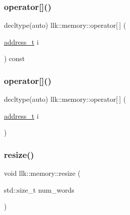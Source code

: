 \subsubsection{\texorpdfstring{operator[]()}{operator[]()}\hspace{0.1cm}{\footnotesize\ttfamily [1/2]}}
{\footnotesize\ttfamily decltype(auto) llk\+::memory\+::operator\mbox{[}$\,$\mbox{]} (\begin{DoxyParamCaption}\item[{\hyperlink{classllk_1_1memory_ae7a4b897aa999f22e250dc8e4d773dec}{address\+\_\+t}}]{i }\end{DoxyParamCaption}) const\hspace{0.3cm}{\ttfamily [inline]}}

\mbox{\label{classllk_1_1memory_aefa4c0ffc2836b50f88d3f67c68eb9b6}} 
\subsubsection{\texorpdfstring{operator[]()}{operator[]()}\hspace{0.1cm}{\footnotesize\ttfamily [2/2]}}
{\footnotesize\ttfamily decltype(auto) llk\+::memory\+::operator\mbox{[}$\,$\mbox{]} (\begin{DoxyParamCaption}\item[{\hyperlink{classllk_1_1memory_ae7a4b897aa999f22e250dc8e4d773dec}{address\+\_\+t}}]{i }\end{DoxyParamCaption})\hspace{0.3cm}{\ttfamily [inline]}}

\mbox{\label{classllk_1_1memory_aaaa33a11f4fcd7d45f4689ef8e5ccb04}} 
\subsubsection{\texorpdfstring{resize()}{resize()}}
{\footnotesize\ttfamily void llk\+::memory\+::resize (\begin{DoxyParamCaption}\item[{std\+::size\+\_\+t}]{num\+\_\+words }\end{DoxyParamCaption})\hspace{0.3cm}{\ttfamily [inline]}}

